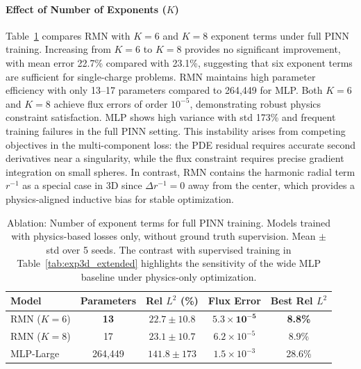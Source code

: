 \documentclass[twoside,11pt]{article}
\begin{document}
\paragraph{Effect of Number of Exponents \texorpdfstring{($K$)}{(K)}} Table~\ref{tab:exp3d_ablation_K} compares RMN with $K=6$ and $K=8$ exponent terms under full PINN training. Increasing from $K=6$ to $K=8$ provides no significant improvement, with mean error 22.7\% compared with 23.1\%, suggesting that six exponent terms are sufficient for single-charge problems. RMN maintains high parameter efficiency with only 13--17 parameters compared to 264,449 for MLP\@. Both $K=6$ and $K=8$ achieve flux errors of order $10^{-5}$, demonstrating robust physics constraint satisfaction. MLP shows high variance with std 173\% and frequent training failures in the full PINN setting. This instability arises from competing objectives in the multi-component loss: the PDE residual requires accurate second derivatives near a singularity, while the flux constraint requires precise gradient integration on small spheres. In contrast, RMN contains the harmonic radial term $r^{-1}$ as a special case in 3D since $\Delta r^{-1} = 0$ away from the center, which provides a physics-aligned inductive bias for stable optimization.

\begin{table}[t]
	\centering
	\begin{tabular}{lcccc}
		\toprule
		Model       & Parameters  & Rel $L^2$ (\%)           & Flux Error                    & Best Rel $L^2$ \\
		\midrule
		RMN ($K=6$) & \textbf{13} & $\mathbf{22.7 \pm 10.8}$ & $\mathbf{5.3 \times 10^{-5}}$ & \textbf{8.8\%} \\
		RMN ($K=8$) & 17          & $23.1 \pm 10.7$          & $6.2 \times 10^{-5}$          & 8.9\%          \\
		MLP-Large   & 264,449     & $141.8 \pm 173$          & $1.5 \times 10^{-3}$          & 28.6\%         \\
		\bottomrule
	\end{tabular}
	\caption{Ablation: Number of exponent terms for full PINN training. Models trained with physics-based losses only, without ground truth supervision. Mean $\pm$ std over 5 seeds. The contrast with supervised training in Table~\ref{tab:exp3d_extended} highlights the sensitivity of the wide MLP baseline under physics-only optimization.}
	\label{tab:exp3d_ablation_K}
\end{table}
\end{document}
